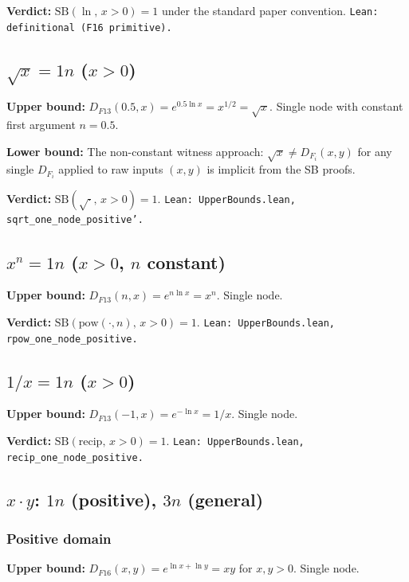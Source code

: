 \documentclass[11pt]{article}
\newcommand{\lv}[1]{\textcolor{lean}{\texttt{#1}}}
\begin{document}
\textbf{Verdict:} $\mathrm{SB}(\ln,\, x>0) = 1$ under the standard paper convention.
\lv{Lean: definitional (F16 primitive).}

\subsection{$\sqrt{x} = 1n$ ($x > 0$)}

\textbf{Upper bound:} $D_{F13}(0.5, x) = e^{0.5 \ln x} = x^{1/2} = \sqrt{x}$.
Single node with constant first argument $n = 0.5$.

\textbf{Lower bound:} The non-constant witness approach: $\sqrt{x} \neq D_{F_i}(x,y)$
for any single $D_{F_i}$ applied to raw inputs $(x,y)$ is implicit from the SB proofs.

\textbf{Verdict:} $\mathrm{SB}(\sqrt{\cdot},\, x>0) = 1$. \lv{Lean: UpperBounds.lean, sqrt\_one\_node\_positive'.}

\subsection{$x^n = 1n$ ($x > 0$, $n$ constant)}

\textbf{Upper bound:} $D_{F13}(n, x) = e^{n \ln x} = x^n$. Single node.

\textbf{Verdict:} $\mathrm{SB}(\mathrm{pow}(\cdot, n),\, x>0) = 1$. \lv{Lean: UpperBounds.lean, rpow\_one\_node\_positive.}

\subsection{$1/x = 1n$ ($x > 0$)}

\textbf{Upper bound:} $D_{F13}(-1, x) = e^{-\ln x} = 1/x$. Single node.

\textbf{Verdict:} $\mathrm{SB}(\mathrm{recip},\, x>0) = 1$. \lv{Lean: UpperBounds.lean, recip\_one\_node\_positive.}

\subsection{$x \cdot y$: $1n$ (positive), $3n$ (general)}

\subsubsection*{Positive domain}

\textbf{Upper bound:} $D_{F16}(x,y) = e^{\ln x + \ln y} = xy$ for $x,y > 0$. Single node.
\end{document}

